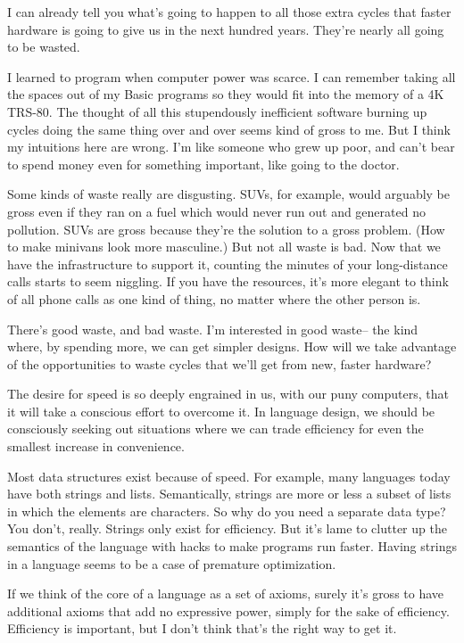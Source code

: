 \documentclass[12pt]{book}
\begin{document}
I can already tell you what's going to happen to all those extra cycles
that faster hardware is going to give us in the next hundred years.
They're nearly all going to be wasted.

I learned to program when computer power was scarce. I can remember
taking all the spaces out of my Basic programs so they would fit into
the memory of a 4K TRS-80. The thought of all this stupendously
inefficient software burning up cycles doing the same thing over and
over seems kind of gross to me. But I think my intuitions here are
wrong. I'm like someone who grew up poor, and can't bear to spend money
even for something important, like going to the doctor.

Some kinds of waste really are disgusting. SUVs, for example, would
arguably be gross even if they ran on a fuel which would never run out
and generated no pollution. SUVs are gross because they're the solution
to a gross problem. (How to make minivans look more masculine.) But not
all waste is bad. Now that we have the infrastructure to support it,
counting the minutes of your long-distance calls starts to seem
niggling. If you have the resources, it's more elegant to think of all
phone calls as one kind of thing, no matter where the other person is.

There's good waste, and bad waste. I'm interested in good waste-- the
kind where, by spending more, we can get simpler designs. How will we
take advantage of the opportunities to waste cycles that we'll get from
new, faster hardware?

The desire for speed is so deeply engrained in us, with our puny
computers, that it will take a conscious effort to overcome it. In
language design, we should be consciously seeking out situations where
we can trade efficiency for even the smallest increase in convenience.

Most data structures exist because of speed. For example, many languages
today have both strings and lists. Semantically, strings are more or
less a subset of lists in which the elements are characters. So why do
you need a separate data type? You don't, really. Strings only exist for
efficiency. But it's lame to clutter up the semantics of the language
with hacks to make programs run faster. Having strings in a language
seems to be a case of premature optimization.

If we think of the core of a language as a set of axioms, surely it's
gross to have additional axioms that add no expressive power, simply for
the sake of efficiency. Efficiency is important, but I don't think
that's the right way to get it.
\end{document}
